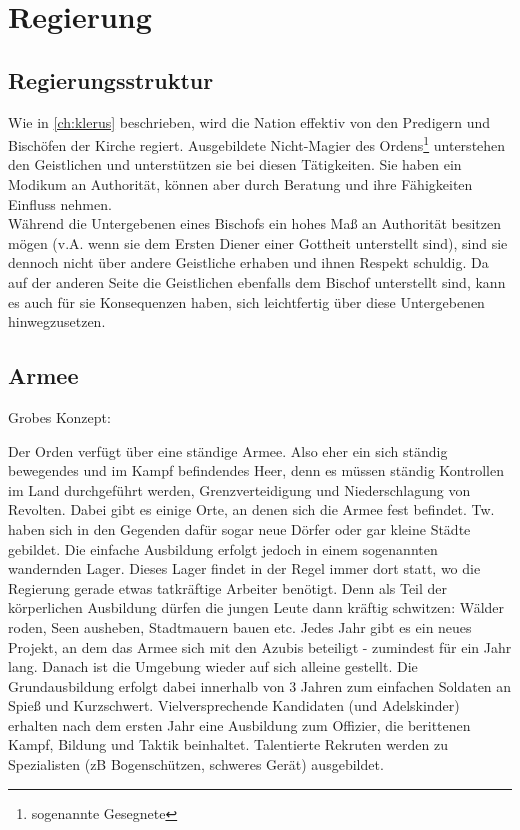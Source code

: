 \chapter{Regierung} \label{ch:regierung}

\section{Regierungsstruktur}
Wie in \ref{ch:klerus} beschrieben, wird die Nation effektiv von den Predigern und Bischöfen der Kirche regiert. 
Ausgebildete Nicht-Magier des Ordens\footnote{sogenannte Gesegnete} unterstehen den Geistlichen und unterstützen sie bei diesen Tätigkeiten. 
Sie haben ein Modikum an Authorität, können aber durch Beratung und ihre Fähigkeiten Einfluss nehmen.\\
Während die Untergebenen eines Bischofs ein hohes Maß an Authorität besitzen mögen (v.A. wenn sie dem Ersten Diener einer Gottheit unterstellt sind), sind sie dennoch nicht über andere Geistliche erhaben und ihnen Respekt schuldig.
Da auf der anderen Seite die Geistlichen ebenfalls dem Bischof unterstellt sind, kann es auch für sie Konsequenzen haben, sich leichtfertig über diese Untergebenen hinwegzusetzen.

\section{Armee}
Grobes Konzept:
\begin{outline}
	\1 Der Orden verfügt über eine ständige Armee. 
		Also eher ein sich ständig bewegendes und im Kampf befindendes Heer, denn es müssen ständig Kontrollen im Land durchgeführt werden, Grenzverteidigung und Niederschlagung von Revolten. 
		Dabei gibt es einige Orte, an denen sich die Armee fest befindet. 
		Tw. haben sich in den Gegenden dafür sogar neue Dörfer oder gar kleine Städte gebildet.
	\1 Die einfache Ausbildung erfolgt jedoch in einem sogenannten wandernden Lager. 
		Dieses Lager findet in der Regel immer dort statt, wo die Regierung gerade etwas tatkräftige Arbeiter benötigt. 
		Denn als Teil der körperlichen Ausbildung dürfen die jungen Leute dann kräftig schwitzen: Wälder roden, Seen ausheben, Stadtmauern bauen etc. 
		Jedes Jahr gibt es ein neues Projekt, an dem das Armee sich mit den Azubis beteiligt - zumindest für ein Jahr lang. 
		Danach ist die Umgebung wieder auf sich alleine gestellt.
	\1 Die Grundausbildung erfolgt dabei innerhalb von 3 Jahren zum einfachen Soldaten an Spieß und Kurzschwert. 
		Vielversprechende Kandidaten (und Adelskinder) erhalten nach dem ersten Jahr eine Ausbildung zum Offizier, die berittenen Kampf, Bildung und Taktik beinhaltet.
		Talentierte Rekruten werden zu Spezialisten (zB Bogenschützen, schweres Gerät) ausgebildet.
\end{outline}

